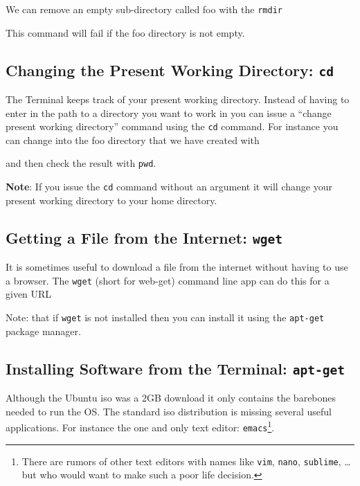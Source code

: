 We can remove an empty sub-directory called foo with the \texttt{rmdir}


This command will fail if the foo directory is not empty.

\newpage
\subsection{Changing the Present Working Directory: \texttt{cd}}

The Terminal keeps track of your present working directory. Instead of having to enter in the path to a directory you want to work in you can issue a ``change present working directory'' command using the \texttt{cd} command. For instance you can change into the foo directory that we have created with


and then check the result with \texttt{pwd}.


{\bf Note}: If you issue the \texttt{cd} command without an argument it will change your present working directory to your home directory.

\newpage
\subsection{Getting a File from the Internet: \texttt{wget}}

It is sometimes useful to download a file from the internet without having to use a browser. The \texttt{wget} (short for web-get) command line app can do this for a given URL


Note: that if \texttt{wget} is not installed then you can install it using the \texttt{apt-get} package manager.

\subsection{Installing Software from the Terminal: \texttt{apt-get}}

Although the Ubuntu iso was a 2GB download it only contains the barebones needed to run the OS. The standard iso distribution is missing several useful applications. For instance the one and only text editor: \texttt{emacs}\footnote{There are rumors of other text editors with names like \texttt{vim}, \texttt{nano}, \texttt{sublime}, \ldots but who would want to make such a poor life decision.}. 

